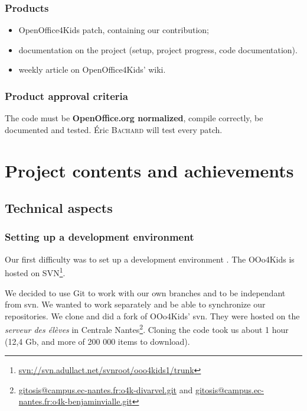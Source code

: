 \documentclass[a4paper,11pt]{article}
\begin{document}
\subsubsection*{Products}

\begin{itemize}
\item OpenOffice4Kids patch, containing our contribution;
\item documentation on the project (setup, project progress, code documentation).
\item weekly article on OpenOffice4Kids' wiki.
\end{itemize}


\subsubsection*{Product approval criteria}

The code must be  \textbf{OpenOffice.org normalized}, compile correctly, be documented and tested. Éric \textsc{Bachard} will test every patch.

\newpage

\fancyfoot[C]{\thepage}
\section*{Project contents and achievements}

\subsection*{Technical aspects}

\subsubsection*{Setting up a development environment}


Our first difficulty was to set up a development environment . The OOo4Kids is hosted on SVN\footnote{\url{svn://svn.adullact.net/svnroot/ooo4kids1/trunk}}.

We decided to use Git to work with our own branches and to be independant from svn. We wanted to work separately and be able to synchronize our repositories. We clone and did a fork of OOo4Kids' svn. They were hosted on the \emph{serveur des élèves} in Centrale Nantes\footnote{\url{gitosis@campus.ec-nantes.fr:o4k-divarvel.git} and \url{gitosis@campus.ec-nantes.fr:o4k-benjaminvialle.git}}.
Cloning the code took us about 1 hour (12,4 Gb, and more of 200 000 items to download).
   
\end{document}
